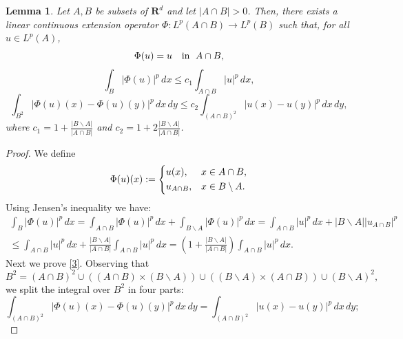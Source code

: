 \documentclass[11pt]{article}
\newcommand{\R}{\mathbf{R}}
\newtheorem{lemma}[theorem]{Lemma}
\theoremstyle{remark}
\begin{document}
\begin{appendices}
\begin{lemma}\label{lemma2.6ver} 	
	Let $A,B$ be subsets of $\R^d$ and let $|A \cap B|>0$.   Then, there exists  a linear  continuous extension operator $\Phi:L^p(A\cap B)\to L^p(B)$ such that,
	for all $u\in L^p(A)$,
	\begin{equation*}%
		\Phi(u)=u \quad\mbox{in }\hspace{0.1cm}A\cap B,
	\end{equation*}
	\begin{equation*}%
		\int_{ B} |\Phi(u)|^p\, dx\le c_1\int_{A\cap B}|u|^p\, dx,
	\end{equation*}
	\begin{equation}\label{3}
		\int_{ B^2}\left| \Phi(u)(x)-\Phi(u)(y)     \right|^p\, dx\, dy\le c_2\int_{(A\cap B)^2}\left|  u(x)- u(y)     \right|^p\, dx\, dy,
	\end{equation}
	where $c_1=1+\frac{| B \backslash A|}{|A \cap  B|}$ and $c_2=1+2\frac{| B \backslash A|}{|A \cap  B|}$.
\end{lemma}
\begin{proof}
	We define 
	\begin{equation*}
		\Phi(u)(x):=
		\begin{dcases}
			u(x), & x\in A\cap B, \\
			u_{A\cap B}, & x\in  B\setminus A.
		\end{dcases}
	\end{equation*}
	Using Jensen's inequality we have:
	\begin{align*}
		\int_{ B} |\Phi(u)|^p\, dx
		= \int_{ A\cap B} |\Phi(u)|^p\, dx+ \int_{ B \backslash A} |\Phi(u)|^p\,dx
		=  \int_{ A\cap B} |u|^p\, dx+ | B \backslash A| |	u_{A\cap B}|^p \\  \leq     \int_{ A\cap B} |u|^p\, dx+\frac{| B \backslash A|}{|A \cap  B|} \int_{A \cap  B} |u|^p \, dx
		= \left(1+\frac{| B \backslash A|}{|A \cap  B|}\right)  \int_{A \cap  B} |u|^p \, dx.
	\end{align*} 	
	Next we prove \eqref{3}. Observing that
	$$  B^2= (A \cap  B)^2\cup \left((A \cap  B) \times (  B \backslash A)\right)\cup \left(( B \backslash A)\times  (A \cap  B)\right) \cup ( B \backslash A)^2,  $$
	we split the integral over $ B^2$ in four parts:
	\begin{equation} \label{int1}
		\int_{(A\cap  B)^2} |\Phi(u)(x)-\Phi(u)(y)|^p \, dx\,dy= 	\int_{(A\cap  B)^2} |u(x)-u(y)|^p \, dx\,dy;
	\end{equation}
	\begin{equation}

\end{equation}
\end{proof}
\end{appendices}
\end{document}
